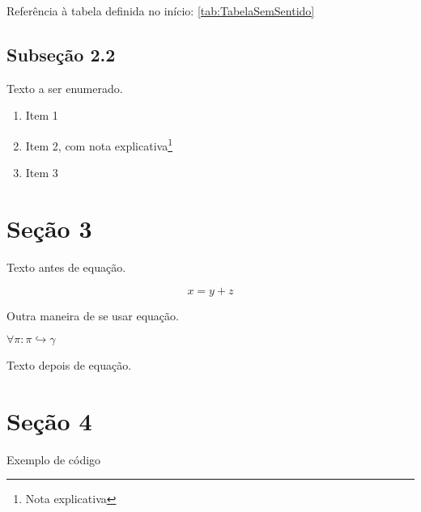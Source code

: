Referência à tabela definida no início: \ref{tab:TabelaSemSentido}


\subsection{Subseção 2.2}

Texto a ser enumerado.

\begin{enumerate}
   \item Item 1
   \item Item 2, com nota explicativa\footnote{Nota explicativa}
   \item Item 3
\end{enumerate}


\section{Seção 3}

Texto antes de equação.

\begin{equation}
   x = y + z
\end{equation}

Outra maneira de se usar equação.

$ \forall \pi : \pi \hookrightarrow \gamma $

Texto depois de equação.

\section{Seção 4}

Exemplo de código
